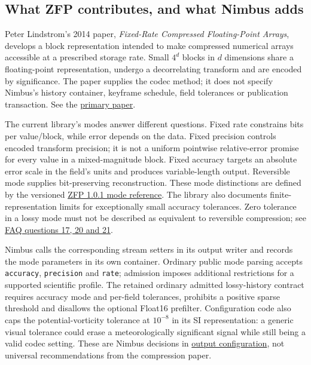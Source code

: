 \subsection{What ZFP contributes, and what Nimbus adds}

Peter Lindstrom's 2014 paper, \emph{Fixed-Rate Compressed Floating-Point Arrays},
develops a block representation intended to make compressed numerical arrays
accessible at a prescribed storage rate. Small $4^d$ blocks in $d$ dimensions
share a floating-point representation, undergo a decorrelating transform and
are encoded by significance. The paper supplies the codec method; it does not
specify Nimbus's history container, keyframe schedule, field tolerances or
publication transaction. See the
\href{https://vis.cs.ucdavis.edu/vis2014papers/TVCG/papers/2674_20tvcg12-lindstrom-2346458.pdf}{primary paper}.

The current library's modes answer different questions. Fixed rate constrains
bits per value/block, while error depends on the data. Fixed precision controls
encoded transform precision; it is not a uniform pointwise relative-error
promise for every value in a mixed-magnitude block. Fixed accuracy targets an
absolute error scale in the field's units and produces variable-length output.
Reversible mode supplies bit-preserving reconstruction. These mode distinctions
are defined by the versioned
\href{https://zfp.readthedocs.io/en/release1.0.1/modes.html}{ZFP 1.0.1 mode reference}.
The library also documents finite-representation limits for exceptionally small
accuracy tolerances. Zero tolerance in a lossy mode must not be described as
equivalent to reversible compression; see
\href{https://zfp.readthedocs.io/en/release1.0.1/faq.html}{FAQ questions 17, 20 and 21}.

Nimbus calls the corresponding stream setters in its output writer and records
the mode parameters in its own container. Ordinary public mode parsing accepts
\texttt{accuracy}, \texttt{precision} and \texttt{rate}; admission imposes
additional restrictions for a supported scientific profile. The retained
ordinary admitted lossy-history contract requires accuracy mode and per-field
tolerances, prohibits a positive sparse threshold and disallows the optional
Float16 prefilter. Configuration code also caps the potential-vorticity
tolerance at $10^{-8}$ in its SI representation: a generic visual tolerance
could erase a meteorologically significant signal while still being a valid
codec setting. These are Nimbus decisions in
\href{../src/core/output/output_config.cpp}{output configuration}, not universal
recommendations from the compression paper.

